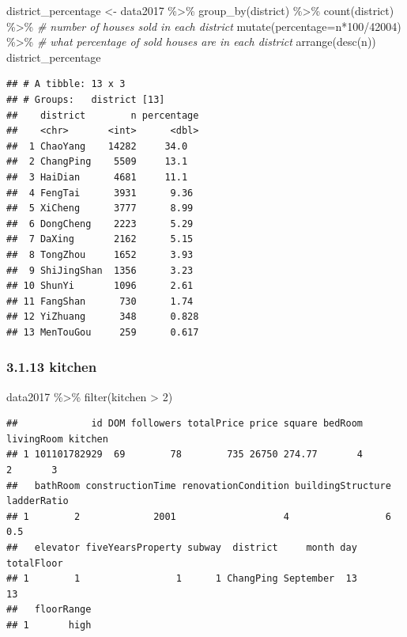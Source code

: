 \documentclass[
]{article}
\newenvironment{Shaded}{\begin{snugshade}}{\end{snugshade}}
\newcommand{\AttributeTok}[1]{\textcolor[rgb]{0.77,0.63,0.00}{#1}}
\newcommand{\CommentTok}[1]{\textcolor[rgb]{0.56,0.35,0.01}{\textit{#1}}}
\newcommand{\DecValTok}[1]{\textcolor[rgb]{0.00,0.00,0.81}{#1}}
\newcommand{\FunctionTok}[1]{\textcolor[rgb]{0.00,0.00,0.00}{#1}}
\newcommand{\NormalTok}[1]{#1}
\newcommand{\OtherTok}[1]{\textcolor[rgb]{0.56,0.35,0.01}{#1}}
\newcommand{\SpecialCharTok}[1]{\textcolor[rgb]{0.00,0.00,0.00}{#1}}
\begin{document}
\begin{Shaded}
\begin{Highlighting}[]
\NormalTok{district\_percentage }\OtherTok{\textless{}{-}}\NormalTok{ data2017 }\SpecialCharTok{\%\textgreater{}\%}
  \FunctionTok{group\_by}\NormalTok{(district) }\SpecialCharTok{\%\textgreater{}\%}
  \FunctionTok{count}\NormalTok{(district) }\SpecialCharTok{\%\textgreater{}\%} \CommentTok{\# number of houses sold in each district}
  \FunctionTok{mutate}\NormalTok{(}\AttributeTok{percentage=}\NormalTok{n}\SpecialCharTok{*}\DecValTok{100}\SpecialCharTok{/}\DecValTok{42004}\NormalTok{) }\SpecialCharTok{\%\textgreater{}\%} \CommentTok{\# what percentage of sold houses are in each district}
  \FunctionTok{arrange}\NormalTok{(}\FunctionTok{desc}\NormalTok{(n))}
\NormalTok{district\_percentage}
\end{Highlighting}
\end{Shaded}

\begin{verbatim}
## # A tibble: 13 x 3
## # Groups:   district [13]
##    district        n percentage
##    <chr>       <int>      <dbl>
##  1 ChaoYang    14282     34.0  
##  2 ChangPing    5509     13.1  
##  3 HaiDian      4681     11.1  
##  4 FengTai      3931      9.36 
##  5 XiCheng      3777      8.99 
##  6 DongCheng    2223      5.29 
##  7 DaXing       2162      5.15 
##  8 TongZhou     1652      3.93 
##  9 ShiJingShan  1356      3.23 
## 10 ShunYi       1096      2.61 
## 11 FangShan      730      1.74 
## 12 YiZhuang      348      0.828
## 13 MenTouGou     259      0.617
\end{verbatim}

\hypertarget{kitchen}{%
\subsubsection{3.1.13 kitchen}\label{kitchen}}

\begin{Shaded}
\begin{Highlighting}[]
\NormalTok{data2017 }\SpecialCharTok{\%\textgreater{}\%} 
  \FunctionTok{filter}\NormalTok{(kitchen }\SpecialCharTok{\textgreater{}} \DecValTok{2}\NormalTok{) }
\end{Highlighting}
\end{Shaded}

\begin{verbatim}
##             id DOM followers totalPrice price square bedRoom livingRoom kitchen
## 1 101101782929  69        78        735 26750 274.77       4          2       3
##   bathRoom constructionTime renovationCondition buildingStructure ladderRatio
## 1        2             2001                   4                 6         0.5
##   elevator fiveYearsProperty subway  district     month day totalFloor
## 1        1                 1      1 ChangPing September  13         13
##   floorRange
## 1       high
\end{verbatim}
\end{document}

